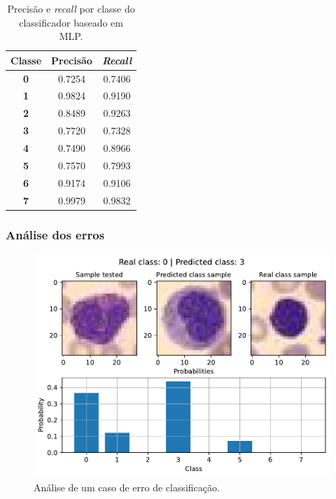 \begin{table}[H]
\centering
\begin{tabular}{c|c|c}
	\textbf{Classe} & \textbf{Precisão} & \textit{\textbf{Recall}} \\ \hline
	\textbf{0}     & 0.7254            & 0.7406                   \\
	\textbf{1}     & 0.9824            & 0.9190                   \\
	\textbf{2}     & 0.8489            & 0.9263                   \\
	\textbf{3}     & 0.7720            & 0.7328                   \\
	\textbf{4}     & 0.7490            & 0.8966                   \\
	\textbf{5}     & 0.7570            & 0.7993                   \\
	\textbf{6}     & 0.9174            & 0.9106                   \\
	\textbf{7}     & 0.9979            & 0.9832                  
\end{tabular}
\caption{Precisão e \textit{recall} por classe do classificador baseado em MLP.}
\label{tab:pr_MLP}
\end{table}

\subsubsection{Análise dos erros}

\begin{figure}[H]
\centering
\includegraphics[width=0.75\linewidth]{../../plot/mlp/error_analyser_88}
\caption{Análise de um caso de erro de classificação.}
\label{fig:error_analyser_88}
\end{figure}

